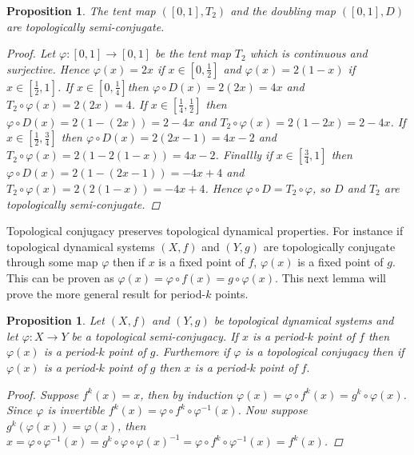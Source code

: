 \documentclass[11pt,a4paper,oneside]{memoir}
\theoremstyle{plain}
\newtheorem{prop}[thm]{Proposition}
\theoremstyle{definition}
\begin{document}
\begin{prop} \label{prop:tent-doubling-semi-conjugate}
    The tent map $([0, 1], T_2)$ and the doubling map $([0, 1], D)$ are topologically semi-conjugate.
    \begin{proof}
        Let $\varphi: [0, 1] \to [0, 1]$ be the tent map $T_2$ which is continuous and surjective. Hence $\varphi(x) = 2x$ if $x \in \left[0, \frac{1}{2}\right]$ and $\varphi(x) = 2(1-x)$ if $x \in \left[\frac{1}{2}, 1\right]$. If $x \in \left[0, \frac{1}{4}\right]$then $\varphi \circ D(x) = 2(2x) = 4x$ and $T_2 \circ \varphi(x) = 2(2x) = 4$. If $x \in \left[\frac{1}{4}, \frac{1}{2}\right]$ then $\varphi \circ D(x) = 2(1 - (2x)) = 2 - 4x$ and $T_2 \circ \varphi(x) = 2(1-2x) = 2 - 4x$. If $x \in \left[\frac{1}{2}, \frac{3}{4}\right]$ then $\varphi \circ D(x) = 2(2x-1) = 4x - 2$ and $T_2 \circ \varphi(x) = 2(1-2(1-x)) = 4x - 2$. Finallly if $x \in \left[\frac{3}{4}, 1\right]$ then $\varphi \circ D(x) = 2(1-(2x - 1)) = - 4x + 4$ and $T_2 \circ \varphi(x) = 2(2(1-x)) = -4x + 4$. Hence $\varphi \circ D = T_2 \circ \varphi$, so $D$ and $T_2$ are topologically semi-conjugate.
    \end{proof}
\end{prop}

Topological conjugacy preserves topological dynamical properties. For instance if topological dynamical systems $(X, f)$ and $(Y, g)$ are topologically conjugate through some map $\varphi$ then if $x$ is a fixed point of $f$, $\varphi(x)$ is a fixed point of $g$. This can be proven as $\varphi(x) = \varphi \circ f(x) = g \circ \varphi(x)$. This next lemma will prove the more general result for period-$k$ points.

\begin{prop} \label{prop:conjugacy-preserves-periodic-points}
    Let $(X, f)$ and $(Y, g)$ be topological dynamical systems and let $\varphi: X \to Y$ be a topological semi-conjugacy. If $x$ is a period-$k$ point of $f$ then $\varphi(x)$ is a period-$k$ point of $g$. Furthemore if $\varphi$ is a topological conjugacy then if $\varphi(x)$ is a period-$k$ point of $g$ then $x$ is a period-$k$ point of $f.$
    \begin{proof}
        Suppose $f^k(x) = x$, then by induction $\varphi(x) = \varphi \circ f^k(x) = g^k \circ \varphi (x)$. Since $\varphi$ is invertible $f^k(x) = \varphi \circ f^k \circ \varphi^{-1}(x)$. Now suppose $g^k(\varphi(x)) = \varphi(x)$, then $x = \varphi \circ \varphi^{-1}(x) = g^k \circ \varphi \circ \varphi(x)^{-1} = \varphi \circ f^k \circ \varphi^{-1}(x) = f^k(x)$.
    \end{proof}
\end{prop}
\end{document}
